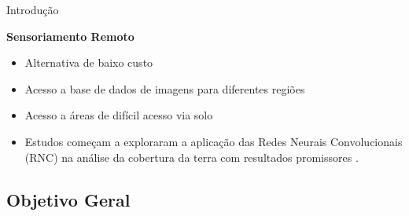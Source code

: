 \documentclass[%
  10pt,%
  aspectratio = 169,%
  compress,%
  t,%
  english,%
  brazilian,%
  tikz,
]{beamer}
\begin{document}
\begin{frame}{Introdução}

\textbf{Sensoriamento Remoto}

    \begin{itemize}
        \item Alternativa de baixo custo
        \item Acesso a base de dados de imagens para diferentes regiões
        \item Acesso a áreas de difícil acesso via solo
        \item Estudos começam a exploraram a aplicação das Redes Neurais Convolucionais (RNC) na análise da cobertura da terra com resultados promissores \cite{HU et al., 2013), (LI et al., 2020}.
    \end{itemize}


\end{frame}



\subsection{Objetivo Geral}\label{ssec:intro1}
\end{document}
